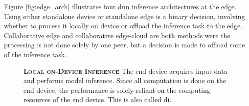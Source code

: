 Figure \ref{fig:edge_arch} illustrates four \gls{dnn} inference architectures at the edge. Using either standalone device  \protect{} or standalone edge \protect{} is a binary decision, involving whether to process it locally on device or offload the inference task to the edge. Collaborative edge\protect{} and collaborative edge-cloud \protect{} are both methods were the processing is not done solely by one peer, but a decision is made to offload some of the inference task.
\begin{figure}
	\begin{minipage}{0.65\linewidth}
		\textbf{\protect{} \textsc{Local on-Device Inference}}
		\color{caption-color} \newline
		The end device acquires input data and performs model inference. Since all computation is done on the end device, the performance is solely reliant on the computing resources of the end device. This is also called \acrlong{di}.
	\end{minipage}%
	\hfill
	\begin{minipage}{0.3\linewidth}
		\centering
		\captionsetup[subfigure]{justification=centering}
		\begin{figure}
			\centering
		\end{figure}
	\end{minipage}
	

\end{figure}
